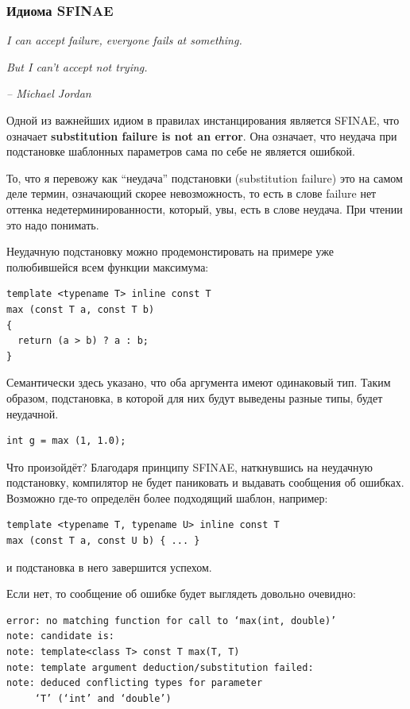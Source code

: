 \documentclass[a4paper,12pt,oneside]{article}
\begin{document}
\subsubsection{Идиома SFINAE}\label{SFINAE}

\hfill\textit{I can accept failure, everyone fails at something.}

\hfill\textit{But I can't accept not trying.}{\vspace{0.5em}}

\hfill\textit{-- Michael Jordan}

Одной из важнейших идиом в правилах инстанцирования является SFINAE, что означает \textbf{substitution failure is not an error}. Она означает, что неудача при подстановке шаблонных параметров сама по себе не является ошибкой.

То, что я перевожу как ``неудача'' подстановки (substitution failure) это на самом деле термин, означающий скорее невозможность, то есть в слове failure нет оттенка недетерминированности, который, увы, есть в слове неудача. При чтении это надо понимать. 

Неудачную подстановку можно продемонстировать на примере уже полюбившейся всем функции максимума:

\begin{lstlisting}
template <typename T> inline const T
max (const T a, const T b)
{
  return (a > b) ? a : b;
}
\end{lstlisting}

Семантически здесь указано, что оба аргумента имеют одинаковый тип. Таким образом, подстановка, в которой для них будут выведены разные типы, будет неудачной.

\begin{lstlisting}
int g = max (1, 1.0);
\end{lstlisting}

Что произойдёт? Благодаря принципу SFINAE, наткнувшись на неудачную подстановку, компилятор не будет паниковать и выдавать сообщения об ошибках. Возможно где-то определён более подходящий шаблон, например:

\begin{lstlisting}
template <typename T, typename U> inline const T 
max (const T a, const U b) { ... }
\end{lstlisting}

и подстановка в него завершится успехом.

Если нет, то сообщение об ошибке будет выглядеть довольно очевидно:

\begin{verbatim}
error: no matching function for call to ‘max(int, double)’
note: candidate is:
note: template<class T> const T max(T, T)
note: template argument deduction/substitution failed:
note: deduced conflicting types for parameter 
     ‘T’ (‘int’ and ‘double’)
\end{verbatim}
\end{document}
